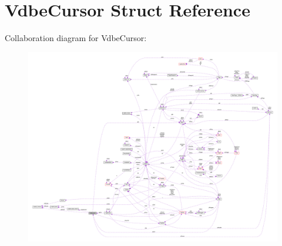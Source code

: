 \hypertarget{struct_vdbe_cursor}{\section{Vdbe\-Cursor Struct Reference}
\label{struct_vdbe_cursor}
}


Collaboration diagram for Vdbe\-Cursor\-:\nopagebreak
\begin{figure}[H]
\begin{center}
\leavevmode
\includegraphics[width=350pt]{struct_vdbe_cursor__coll__graph}
\end{center}
\end{figure}
